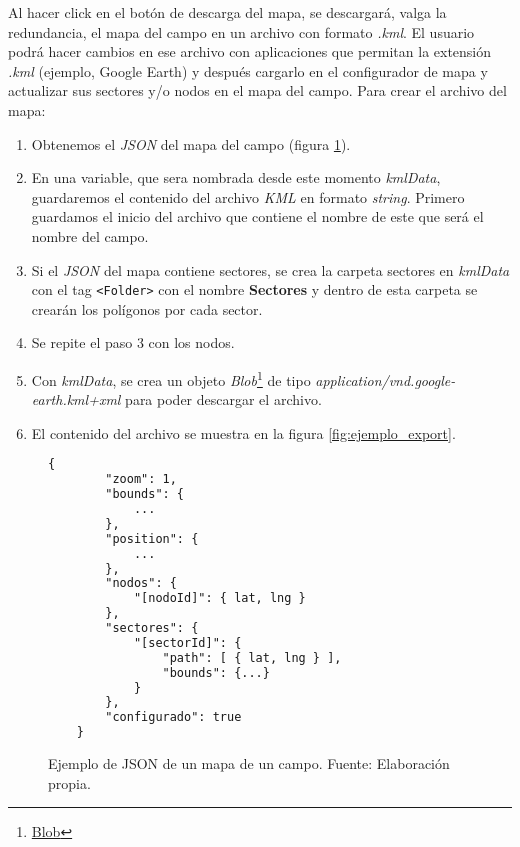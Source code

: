 Al hacer click en el botón de descarga del mapa, se descargará, valga la redundancia, el mapa del campo en un archivo con formato \textit{.kml}. El usuario podrá hacer cambios en ese archivo con aplicaciones que permitan la extensión \textit{.kml} (ejemplo, Google Earth) y después cargarlo en el configurador de mapa y actualizar sus sectores y/o nodos en el mapa del campo.
Para crear el archivo del mapa: 
\begin{enumerate}
    \item Obtenemos el \textit{JSON} del mapa del campo (figura \ref{fig:ejemplo-mapa-json}).
    \item En una variable, que sera nombrada desde este momento \textit{kmlData}, guardaremos el contenido del archivo \textit{KML} en formato \textit{string}. Primero guardamos el inicio del archivo que contiene el nombre de este que será el nombre del campo.
    \item Si el \textit{JSON} del mapa contiene sectores, se crea la carpeta sectores en \textit{kmlData} con el tag \texttt{<Folder>} con el nombre \textbf{Sectores} y dentro de esta carpeta se crearán los polígonos por cada sector.
    \item Se repite el paso 3 con los nodos.
    \item Con \textit{kmlData}, se crea un objeto \textit{Blob}\footnote{\href{https://developer.mozilla.org/es/docs/Web/API/Blob}{Blob}} de tipo \textit{application/vnd.google-earth.kml+xml} para poder descargar el archivo.
    \item El contenido del archivo se muestra en la figura \ref{fig:ejemplo_export}.
\end{enumerate}
\begin{figure}[H]
    \centering
    \begin{lstlisting}[language=XML, frame=single, basicstyle=\ttfamily\small]
    {
        "zoom": 1,
        "bounds": {
            ...
        },
        "position": {
            ...
        },
        "nodos": {
            "[nodoId]": { lat, lng }
        },
        "sectores": {
            "[sectorId]": {
                "path": [ { lat, lng } ],
                "bounds": {...}
            }
        },
        "configurado": true
    }     
    \end{lstlisting}
    \caption{Ejemplo de JSON de un mapa de un campo. Fuente: Elaboración propia.}
    \label{fig:ejemplo-mapa-json}
\end{figure}
